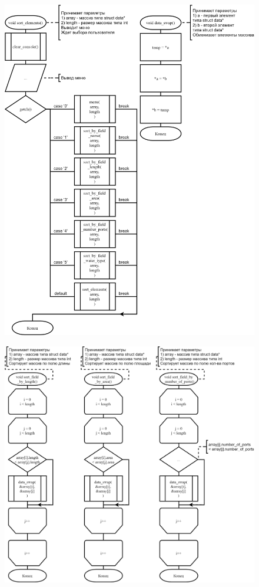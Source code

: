 \begin{figure}[!htp]
    \includegraphics[width=17cm]{../../Makefile-project/src/submenu/sort_elements/sort_elements-1.png}
\end{figure}
\begin{figure}[!htp]
    \includegraphics[width=17cm]{../../Makefile-project/src/submenu/sort_elements/sort_elements-2.png}
\end{figure}

